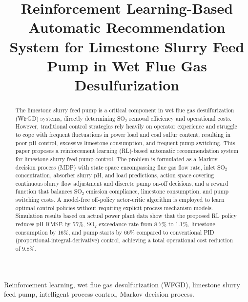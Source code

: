 \documentclass[journal]{IEEEtran}
\begin{document}
\title{Reinforcement Learning-Based Automatic Recommendation System for Limestone Slurry Feed Pump in Wet Flue Gas Desulfurization}

\author{
}

\maketitle

\begin{abstract}
The limestone slurry feed pump is a critical component in wet flue gas desulfurization (WFGD) systems, directly determining SO$_2$ removal efficiency and operational costs. However, traditional control strategies rely heavily on operator experience and struggle to cope with frequent fluctuations in power load and coal sulfur content, resulting in poor pH control, excessive limestone consumption, and frequent pump switching. This paper proposes a reinforcement learning (RL)-based automatic recommendation system for limestone slurry feed pump control. The problem is formulated as a Markov decision process (MDP) with state space encompassing flue gas flow rate, inlet SO$_2$ concentration, absorber slurry pH, and load predictions, action space covering continuous slurry flow adjustment and discrete pump on-off decisions, and a reward function that balances SO$_2$ emission compliance, limestone consumption, and pump switching costs. A model-free off-policy actor-critic algorithm is employed to learn optimal control policies without requiring explicit process mechanism models. Simulation results based on actual power plant data show that the proposed RL policy reduces pH RMSE by 55\%, SO$_2$ exceedance rate from 8.7\% to 1.1\%, limestone consumption by 16\%, and pump starts by 66\% compared to conventional PID (proportional-integral-derivative) control, achieving a total operational cost reduction of 9.8\%.
\end{abstract}

\begin{IEEEkeywords}
Reinforcement learning, wet flue gas desulfurization (WFGD), limestone slurry feed pump, intelligent process control, Markov decision process.
\end{IEEEkeywords}
\end{document}
